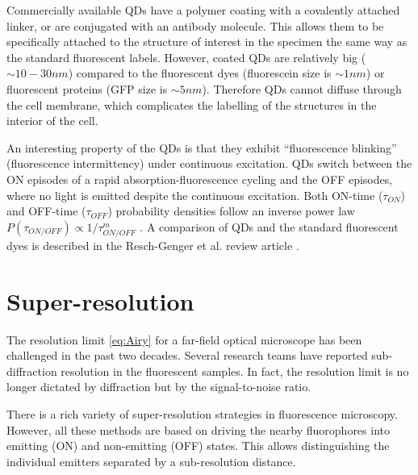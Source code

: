 Commercially available QDs have a polymer coating with a covalently attached linker, or are conjugated with an antibody molecule. This allows them to be specifically attached to the structure of interest in the specimen the same way as the standard fluorescent labels. However, coated QDs are relatively big ($\sim10-30\unit{nm}$) compared to the fluorescent dyes (fluorescein size is $\sim1\unit{nm}$) or fluorescent proteins (GFP size is $\sim5\unit{nm}$). Therefore QDs cannot diffuse through the cell membrane, which complicates the labelling of the structures in the interior of the cell. 

An interesting property of the QDs is that they exhibit ``fluorescence blinking'' (fluorescence intermittency) under continuous excitation. QDs switch between the ON episodes of a rapid absorption-fluorescence cycling and the OFF episodes, where no light is emitted despite the continuous excitation. Both ON-time ($\tau_{ON}$) and OFF-time ($\tau_{OFF}$) probability densities follow an inverse power law $P(\tau_{ON/OFF})\propto1/\tau_{ON/OFF}^{m}$ \cite{Kuno2001, Stefani2009}. A comparison of QDs and the standard fluorescent dyes is described in the Resch-Genger et al. review article \cite{Resch-Genger2008}.


\section{Super-resolution\label{sec:super-resolution}}

The resolution limit \autoref{eq:Airy} for a far-field optical microscope has been challenged in the past two decades. Several research teams have reported sub-diffraction resolution in the fluorescent samples. In fact, the resolution limit is no longer dictated by diffraction but by the signal-to-noise ratio. 

There is a rich variety of super-resolution strategies in fluorescence microscopy. However, all these methods are based on driving the nearby fluorophores into emitting (ON) and non-emitting (OFF) states. This allows distinguishing the individual emitters separated by a sub-resolution distance.

